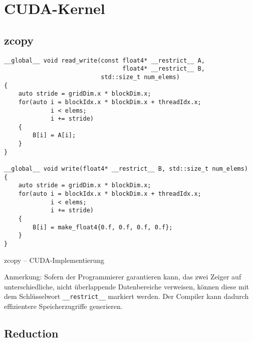 \appendix

\section{CUDA-Kernel}

\subsection{zcopy}

\begin{code}
    \begin{verbatim}
__global__ void read_write(const float4* __restrict__ A,
                                 float4* __restrict__ B,
                           std::size_t num_elems)
{
    auto stride = gridDim.x * blockDim.x;
    for(auto i = blockIdx.x * blockDim.x + threadIdx.x;
             i < elems;
             i += stride)
    {
        B[i] = A[i];
    }
}

__global__ void write(float4* __restrict__ B, std::size_t num_elems)
{
    auto stride = gridDim.x * blockDim.x;
    for(auto i = blockIdx.x * blockDim.x + threadIdx.x;
             i < elems;
             i += stride)
    {
        B[i] = make_float4{0.f, 0.f, 0.f, 0.f};
    }
}
    \end{verbatim}
    \caption{zcopy -- CUDA-Implementierung}
    \label{anhang:cuda:zcopy}
\end{code}

Anmerkung: Sofern der Programmierer garantieren kann, das zwei Zeiger auf
unterschiedliche, nicht überlappende Datenbereiche verweisen, können diese mit
dem Schlüsselwort \texttt{\_\_restrict\_\_} markiert werden. Der Compiler kann
dadurch effizientere Speicherzugriffe generieren.

\subsection{Reduction}

